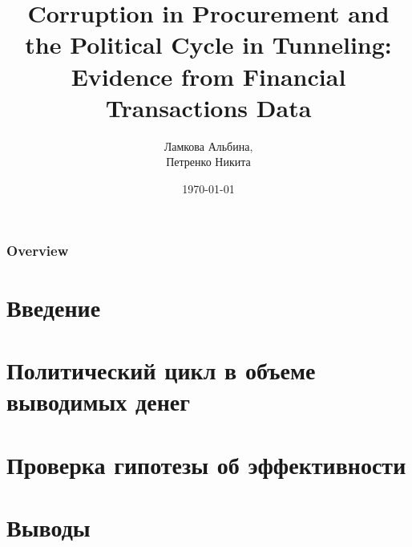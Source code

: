 \documentclass{beamer}
\title[Corruption in Procurement]{Corruption in Procurement and the Political Cycle in Tunneling: Evidence from Financial Transactions Data}
\author{Ламкова Альбина,\\ Петренко Никита}
\date{\today}
\begin{document}
\begin{frame}
\titlepage
\end{frame}

\begin{frame}
\frametitle{Overview} %
\tableofcontents
\end{frame}



\section{Введение} 



\section{Политический цикл в объеме выводимых денег}



\section{Проверка гипотезы об эффективности}


\section{Выводы}

\end{document}
